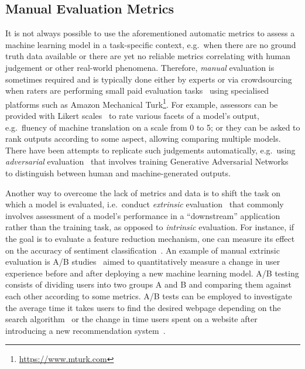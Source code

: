 \subsection{Manual Evaluation Metrics}
It is not always possible to use the aforementioned automatic metrics to assess a machine learning model in a task-specific context, e.g.\ when there are no ground truth data available or there are yet no reliable metrics correlating with human judgement or other real-world phenomena.
Therefore, \emph{manual} evaluation is sometimes required and is typically done either by experts or via crowdsourcing when raters are performing small paid evaluation tasks~\citep{Alonso2008} using specialised platforms such as Amazon Mechanical Turk\footnote{\url{https://www.mturk.com}}.
For example, assessors can be provided with Likert scales~\citep{Likert1932} to rate various facets of a model's output, e.g.\ fluency of machine translation on a scale from 0 to 5;
or they can be asked to rank outputs according to some aspect, allowing comparing multiple models.
%
There have been attempts to replicate such judgements automatically, e.g.\
using \emph{adversarial} evaluation~\citep{martin2018speech} that
involves training Generative Adversarial Networks~\citep{Goodfellow2014} to distinguish between human and machine-generated outputs.

Another way to overcome the lack of metrics and data is to shift the task on which a model is evaluated, i.e.\ conduct \emph{extrinsic} evaluation~\citep{Belz2008} that commonly involves assessment of a model's performance in a ``downstream'' application rather than the training task, as opposed to \emph{intrinsic} evaluation.
For instance, if the goal is to evaluate a feature reduction mechanism, one can measure its effect on the accuracy of sentiment classification~\citep{Schnabel2015}.
%
An example of manual extrinsic evaluation is A/B studies~\citep{Hofmann2016} aimed to quantitatively measure a change in user experience before and after deploying a new machine learning model.
A/B testing consists of dividing users into two groups A and B and comparing them against each other according to some metrics.
%
A/B tests can be employed to investigate the average time it takes users to find the desired webpage depending on the search algorithm~\citep{Manning2008}
or the change in time users spent on a website after introducing a new recommendation system~\citep{Davidson2010}.

